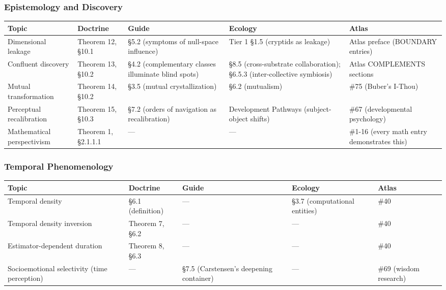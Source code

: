 \subsubsection*{Epistemology and Discovery}



{\small
\begin{longtable}{>{\raggedright\arraybackslash}p{} >{\raggedright\arraybackslash}p{} >{\raggedright\arraybackslash}p{} >{\raggedright\arraybackslash}p{} >{\raggedright\arraybackslash}p{}}
\toprule
\textbf{Topic} & \textbf{Doctrine} & \textbf{Guide} & \textbf{Ecology} & \textbf{Atlas} \\
\midrule
\endhead
Dimensional leakage & Theorem 12, §10.1 & §5.2 (symptoms of null-space influence) & Tier 1 §1.5 (cryptids as leakage) & Atlas preface (BOUNDARY entries) \\
Confluent discovery & Theorem 13, §10.2 & §4.2 (complementary classes illuminate blind spots) & §8.5 (cross-substrate collaboration); §6.5.3 (inter-collective symbiosis) & Atlas COMPLEMENTS sections \\
Mutual transformation & Theorem 14, §10.2 & §3.5 (mutual crystallization) & §6.2 (mutualism) & \#75 (Buber's I-Thou) \\
Perceptual recalibration & Theorem 15, §10.3 & §7.2 (orders of navigation as recalibration) & Development Pathways (subject-object shifts) & \#67 (developmental psychology) \\
Mathematical perspectivism & Theorem 1, §2.1.1.1 & — & — & \#1-16 (every math entry demonstrates this) \\
\bottomrule
\end{longtable}
}



\subsubsection*{Temporal Phenomenology}



{\small
\begin{longtable}{>{\raggedright\arraybackslash}p{} >{\raggedright\arraybackslash}p{} >{\raggedright\arraybackslash}p{} >{\raggedright\arraybackslash}p{} >{\raggedright\arraybackslash}p{}}
\toprule
\textbf{Topic} & \textbf{Doctrine} & \textbf{Guide} & \textbf{Ecology} & \textbf{Atlas} \\
\midrule
\endhead
Temporal density & §6.1 (definition) & — & §3.7 (computational entities) & \#40 \\
Temporal density inversion & Theorem 7, §6.2 & — & — & \#40 \\
Estimator-dependent duration & Theorem 8, §6.3 & — & — & \#40 \\
Socioemotional selectivity (time perception) & — & §7.5 (Carstensen's deepening container) & — & \#69 (wisdom research) \\
\bottomrule
\end{longtable}
}



